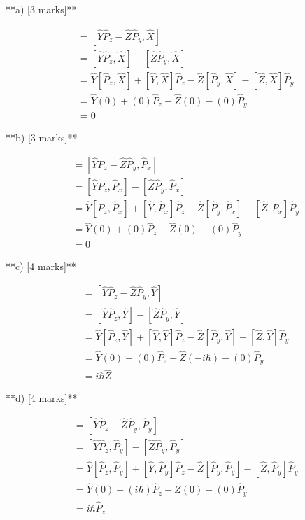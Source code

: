 \documentclass{article}
\begin{document}
**a)  [3 marks]**

\begin{align*}
[\hat{L}_x, \hat{X}] &= [\hat{Y}\hat{P}_z - \hat{Z}\hat{P}_y, \hat{X}] \\
&= [\hat{Y}\hat{P}_z, \hat{X}] - [\hat{Z}\hat{P}_y, \hat{X}] \\
&= \hat{Y}[\hat{P}_z, \hat{X}] + [\hat{Y}, \hat{X}]\hat{P}_z - \hat{Z}[\hat{P}_y, \hat{X}] - [\hat{Z}, \hat{X}]\hat{P}_y \\
&= \hat{Y}(0) + (0)\hat{P}_z - \hat{Z}(0) - (0)\hat{P}_y \\
&= 0 
\end{align*}

**b) [3 marks]**

\begin{align*}
[\hat{L}_x, \hat{P}_x] &= [\hat{Y}\hat{P}_z - \hat{Z}\hat{P}_y, \hat{P}_x] \\
&= [\hat{Y}\hat{P}_z, \hat{P}_x] - [\hat{Z}\hat{P}_y, \hat{P}_x] \\
&= \hat{Y}[\hat{P}_z, \hat{P}_x] + [\hat{Y}, \hat{P}_x]\hat{P}_z - \hat{Z}[\hat{P}_y, \hat{P}_x] - [\hat{Z}, \hat{P}_x]\hat{P}_y \\
&= \hat{Y}(0) + (0)\hat{P}_z - \hat{Z}(0) - (0)\hat{P}_y \\
&= 0
\end{align*}

**c) [4 marks]**

\begin{align*}
[\hat{L}_x, \hat{Y}] &= [\hat{Y}\hat{P}_z - \hat{Z}\hat{P}_y, \hat{Y}] \\
&= [\hat{Y}\hat{P}_z, \hat{Y}] - [\hat{Z}\hat{P}_y, \hat{Y}] \\
&= \hat{Y}[\hat{P}_z, \hat{Y}] + [\hat{Y}, \hat{Y}]\hat{P}_z - \hat{Z}[\hat{P}_y, \hat{Y}] - [\hat{Z}, \hat{Y}]\hat{P}_y \\
&= \hat{Y}(0) + (0)\hat{P}_z - \hat{Z}(-i\hbar) - (0)\hat{P}_y \\
&= i\hbar \hat{Z}
\end{align*}

**d) [4 marks]**

\begin{align*}
[\hat{L}_x, \hat{P}_y] &= [\hat{Y}\hat{P}_z - \hat{Z}\hat{P}_y, \hat{P}_y] \\
&= [\hat{Y}\hat{P}_z, \hat{P}_y] - [\hat{Z}\hat{P}_y, \hat{P}_y] \\
&= \hat{Y}[\hat{P}_z, \hat{P}_y] + [\hat{Y}, \hat{P}_y]\hat{P}_z - \hat{Z}[\hat{P}_y, \hat{P}_y] - [\hat{Z}, \hat{P}_y]\hat{P}_y \\
&= \hat{Y}(0) + (i\hbar)\hat{P}_z - \hat{Z}(0) - (0)\hat{P}_y \\
&= i\hbar \hat{P}_z
\end{align*}
\end{document}
